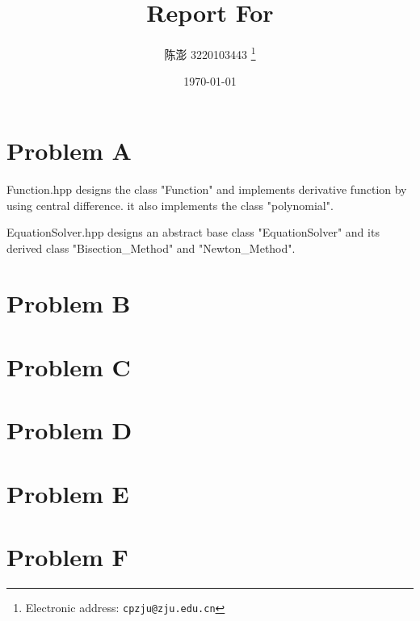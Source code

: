 \documentclass[a4paper]{article}
\begin{document}
\title{Report For}

\author{陈澎 3220103443
  \thanks{Electronic address: \texttt{cpzju@zju.edu.cn}}}


\date{\today}

\maketitle

\section*{Problem A}
Function.hpp designs the class "Function" and implements derivative function by using central difference. it also implements the class "polynomial".

EquationSolver.hpp designs an abstract base class "EquationSolver" and its derived class "Bisection_Method" and "Newton_Method".

\section*{Problem B}

\section*{Problem C}

\section*{Problem D}

\section*{Problem E}

\section*{Problem F}
\end{document}
